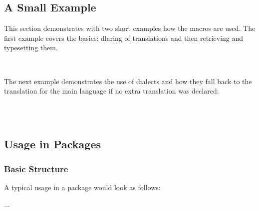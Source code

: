 \documentclass[DIV11,toc=index,toc=bib,numbers=noendperiod]{cnpkgdoc}
\begin{document}
\subsection{A Small Example}
This section demonstrates with two short examples how the macros are used.
The first example covers the basics: dlaring of translations and then
retrieving and typesetting them.

\begin{beispiel}
 
 \SaveTranslation{}
 \SaveTranslationFor{}

  \kitchen\ 
 \cuisine
\end{beispiel}

The next example demonstrates the use of dialects and how they fall back to
the translation for the main language if no extra translation was declared:

\begin{beispiel}

  \\
  \\
\end{beispiel}

\subsection{Usage in Packages}
\subsubsection{Basic Structure}
A typical usage in a package would look as follows:
\begin{beispiel}
 \RequirePackage{translations}
 ...
 \def\mypackage@title{\GetTranslation{mypackage-title}}
\end{beispiel}
\end{document}
